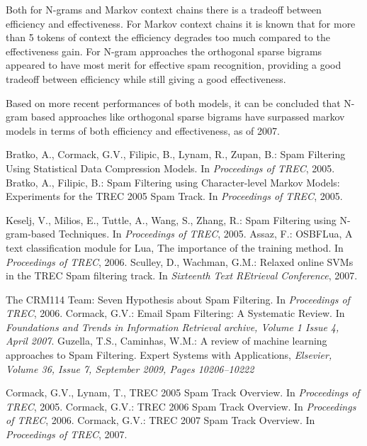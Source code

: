 \documentclass[runningheads,a4paper]{llncs}
\begin{document}
Both for N-grams and Markov context chains there is a tradeoff between efficiency 
and effectiveness. For Markov context chains it is known that for more than 5 tokens
of context the efficiency degrades too much compared to the effectiveness gain. 
For N-gram approaches the orthogonal sparse bigrams appeared to have most merit 
for effective spam recognition, providing a good tradeoff between efficiency while 
still giving a good effectiveness.

Based on more recent performances of both models, it can be concluded that N-gram
based approaches like orthogonal sparse bigrams have surpassed markov models in terms
of both efficiency and effectiveness, as of 2007.

\begin{thebibliography}{4}

 Bratko, A., Cormack, G.V., Filipic, B., Lynam, R., Zupan, B.: Spam Filtering Using Statistical Data Compression Models. In \emph{Proceedings of TREC}, 2005.
 Bratko, A., Filipic, B.: Spam Filtering using Character-level Markov Models: Experiments for the TREC 2005 Spam Track. In \emph{Proceedings of TREC}, 2005.

 Keselj, V., Milios, E., Tuttle, A., Wang, S., Zhang, R.: Spam Filtering using N-gram-based Techniques. In \emph{Proceedings of TREC}, 2005.
 Assaz, F.: OSBF­Lua,­ A text classification module for Lua, The importance of the training method. In \emph{Proceedings of TREC}, 2006.
 Sculley, D., Wachman, G.M.: Relaxed online SVMs in the TREC Spam 
filtering track. In \emph{Sixteenth Text REtrieval Conference}, 2007.

 The CRM114 Team: Seven Hypothesis about Spam Filtering. In \emph{Proceedings of TREC}, 2006.
 Cormack, G.V.: Email Spam Filtering: A Systematic Review. In \emph{Foundations and Trends in Information Retrieval archive, Volume 1 Issue 4, April 2007}.
 Guzella, T.S., Caminhas, W.M.: A review of machine learning approaches to Spam Filtering. Expert Systems with Applications, \emph{Elsevier, Volume 36, Issue 7, September 2009, Pages 10206–10222}


 Cormack, G.V., Lynam, T., TREC 2005 Spam Track Overview. In \emph{Proceedings of TREC}, 2005.
 Cormack, G.V.: TREC 2006 Spam Track Overview. In \emph{Proceedings of TREC}, 2006.
 Cormack, G.V.: TREC 2007 Spam Track Overview. In \emph{Proceedings of TREC}, 2007.


\end{thebibliography}
\end{document}
